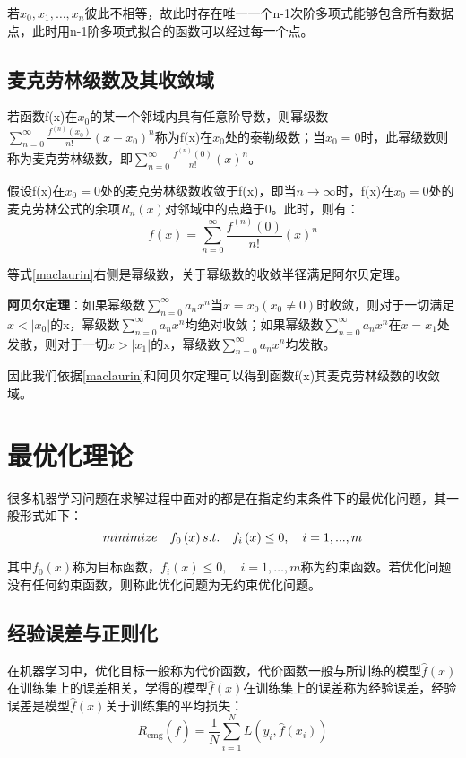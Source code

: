 若$x_0,x_1,…,x_n$彼此不相等，故此时存在唯一一个n-1次阶多项式能够包含所有数据点，此时用n-1阶多项式拟合的函数可以经过每一个点。

\subsection{麦克劳林级数及其收敛域}
若函数f(x)在$x_0$的某一个邻域内具有任意阶导数，则幂级数$\sum_{n=0}^{\infty}{\frac{f^{\left( n \right)}\left( x_0 \right)}{n!}}\left( x-x_0 \right) ^n$称为f(x)在$x_0$处的泰勒级数；当$x_0=0$时，此幂级数则称为麦克劳林级数，即$\sum_{n=0}^{\infty}{\frac{f^{\left( n \right)}\left( 0 \right)}{n!}}\left( x \right) ^n$。

假设f(x)在$x_0=0$处的麦克劳林级数收敛于f(x)，即当$n\rightarrow \infty $时，f(x)在$x_0=0$处的麦克劳林公式的余项$R_n(x)$对邻域中的点趋于0。此时，则有：
\begin{equation}
\label{maclaurin}
f\left( x \right) =\sum_{n=0}^{\infty}{\frac{f^{\left( n \right)}\left( 0 \right)}{n!}}\left( x \right) ^n
\end{equation}

等式\ref{maclaurin}右侧是幂级数，关于幂级数的收敛半径满足阿尔贝定理。

\textbf{阿贝尔定理}：如果幂级数$\sum_{n=0}^{\infty}{a_nx^n}$当$x=x_0(x_0 \ne 0)$时收敛，则对于一切满足$x<|x_0|$的x，幂级数$\sum_{n=0}^{\infty}{a_nx^n}$均绝对收敛；如果幂级数$\sum_{n=0}^{\infty}{a_nx^n}$在$x=x_1$处发散，则对于一切$x>|x_1|$的x，幂级数$\sum_{n=0}^{\infty}{a_nx^n}$均发散。

因此我们依据\ref{maclaurin}和阿贝尔定理可以得到函数f(x)其麦克劳林级数的收敛域。

\section{最优化理论}
很多机器学习问题在求解过程中面对的都是在指定约束条件下的最优化问题，其一般形式如下：
\[
minimize\quad f_0\left( x \right) \\
s.t.\quad f_i\left( x \right) \le 0,\quad i=1,...,m
\]

其中$f_0(x)$称为目标函数，$f_{i}(x) \leq 0, \quad i=1, \ldots, m$称为约束函数。若优化问题没有任何约束函数，则称此优化问题为无约束优化问题。

\subsection{经验误差与正则化}
在机器学习中，优化目标一般称为代价函数，代价函数一般与所训练的模型$\hat{f}\left( x \right) $在训练集上的误差相关，学得的模型$\hat{f}\left( x \right) $在训练集上的误差称为经验误差，经验误差是模型$\hat{f}\left( x \right) $关于训练集的平均损失：
\[
R_{\text{emg}}\left( \hat{f} \right) =\frac{1}{N}\sum_{i=1}^N{L}\left( y_i,\hat{f}\left( x_i \right) \right) 
\]

